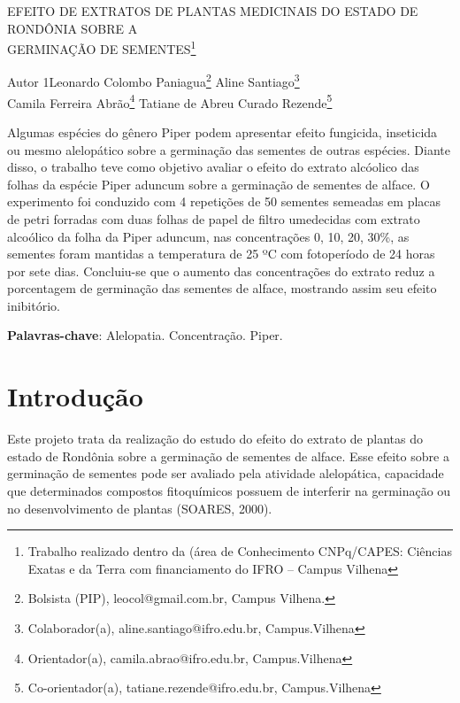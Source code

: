 \documentclass[article,12pt,onesidea,4paper,english,brazil]{abntex2}
\begin{document}
	
	
	\frenchspacing 
	
	\begin{center}
		\LARGE EFEITO DE EXTRATOS DE PLANTAS MEDICINAIS DO ESTADO DE RONDÔNIA SOBRE A\\GERMINAÇÃO DE SEMENTES\footnote{Trabalho realizado dentro da (área de Conhecimento CNPq/CAPES: Ciências Exatas e da Terra com financiamento do IFRO – Campus Vilhena}
		
		\normalsize
		Autor 1Leonardo Colombo Paniagua\footnote{Bolsista (PIP), leocol@gmail.com.br, Campus Vilhena.} 
		Aline Santiago\footnote{Colaborador(a), aline.santiago@ifro.edu.br, Campus.Vilhena} \\
		Camila Ferreira Abrão\footnote{Orientador(a), camila.abrao@ifro.edu.br, Campus.Vilhena} 
		 Tatiane de Abreu Curado Rezende\footnote{Co-orientador(a), tatiane.rezende@ifro.edu.br, Campus.Vilhena} 
	\end{center}
	
	\begin{resumoumacoluna}
		Algumas espécies do gênero Piper podem apresentar efeito fungicida, inseticida ou mesmo alelopático sobre a germinação das sementes de outras espécies. Diante disso, o trabalho teve como objetivo avaliar o efeito do extrato alcóolico das folhas da espécie Piper aduncum sobre a germinação de sementes de alface. O experimento foi conduzido com 4 repetições de 50 sementes semeadas em placas de petri forradas com duas folhas de papel de filtro umedecidas com extrato alcoólico da folha da Piper aduncum, nas concentrações 0, 10, 20, 30\%, as sementes foram mantidas a temperatura de 25 ºC com fotoperíodo de 24 horas por sete dias. Concluiu-se que o aumento das concentrações do extrato reduz a porcentagem de germinação das sementes de alface, mostrando assim seu efeito inibitório.
		
		\vspace{\onelineskip}
		
		\noindent
		\textbf{Palavras-chave}: Alelopatia. Concentração. Piper.
		
	\end{resumoumacoluna}
	
	\section*{Introdução}
	
	Este projeto trata da realização do estudo do efeito do extrato de plantas do estado de Rondônia sobre a germinação de sementes de alface. Esse efeito sobre a germinação de sementes pode ser avaliado pela atividade alelopática, capacidade que determinados compostos fitoquímicos possuem de interferir na germinação ou no desenvolvimento de plantas (SOARES, 2000).
	
\end{document}
